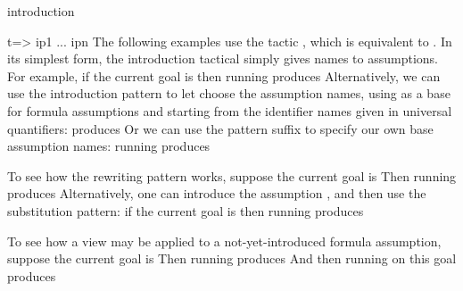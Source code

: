 \begin{tactic}[$t$ =>$\;\iota_1 \cdots \iota_n$]{introduction}
\begin{tsyntax}[empty]{t=> ip1 ... ipn}
    The following examples use the tactic , which is
    equivalent to .
    In its simplest form, the introduction tactical simply gives names
    to assumptions.  For example, if the current goal is
    then running
    produces
    Alternatively, we can use the introduction pattern 
    to let \EasyCrypt choose the assumption names, using
     as a base for formula assumptions and starting
    from the identifier names given in universal quantifiers:
    produces
    Or we can use the \ec{!} pattern suffix to specify our
    own base assumption names: running
    produces

    To see how the \ec{->} rewriting pattern works, suppose
    the current goal is
    Then running
    produces
    Alternatively, one can introduce the assumption ,
    and then use the \ec{->>} substitution pattern:
    if the current goal is
    then running
    produces

    To see how a view may be applied to a not-yet-introduced formula
    assumption, suppose the current goal is
    Then running
    produces
    And then running
    on this goal produces


\end{tsyntax}
\end{tactic}
